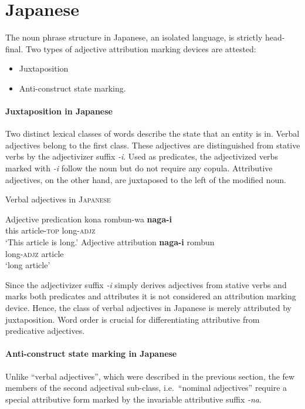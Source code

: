 \section{Japanese}
The noun phrase structure in Japanese, an isolated language, is strictly head-final. Two types of adjective attribution marking devices are attested:
\begin{itemize}
\item Juxtaposition
\item Anti-construct state marking.
\end{itemize}

\paragraph{Juxtaposition in Japanese}
Two distinct lexical classes of words describe the state that an entity is in. Verbal adjectives belong to the first class. These adjectives are distinguished from stative verbs by the adjectivizer suffix \textit{-i}. Used as predicates, the adjectivized verbs marked with \textit{-i} follow the noun but do not require any copula. Attributive adjectives, on the other hand, are juxtaposed to the left of the modified noun. 

\begin{exe}
\ex Verbal adjectives in \textsc{Japanese} \citep[170]{backhouse1984}
\begin{xlist}
\ex Adjective predication 
\gll	kona rombun-wa \textbf{naga-i}\\
	this article-\textsc{top} long-\textsc{adjz}\\%
\glt	‘This article is long.’
\ex Adjective attribution
\gll	\textbf{naga-i} rombun\\
	long-\textsc{adjz} article\\
\glt	‘long article’
\end{xlist}
\end{exe}
Since the adjectivizer suffix \textit{-i} simply derives adjectives from stative verbs and marks both predicates and attributes it is not considered an attribution marking device. Hence, the class of verbal adjectives in Japanese is merely attributed by juxtaposition. Word order is crucial for differentiating attributive from predicative adjectives. 

\paragraph{Anti-construct state marking in Japanese}
Unlike “verbal adjectives”, which were described in the previous section, the few members of the second adjectival sub-class, i.e.~“nominal adjectives” require a special attributive form marked by the invariable attributive suffix \textit{-na}. 

